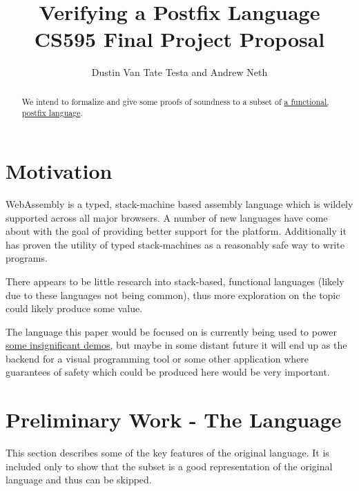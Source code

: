 \documentclass{article}
\title{Verifying a Postfix Language \\
    \large CS595 Final Project Proposal}
\author{Dustin Van Tate Testa and Andrew Neth}
\begin{document}
\maketitle
\begin{abstract}
We intend to formalize and give some proofs of soundness to a subset of \href{https://github.com/dvtate/postfix-haskell}{a functional, postfix language}.
\end{abstract}

\section{Motivation}
WebAssembly is a typed, stack-machine based assembly language which is wildely supported across all major browsers. A number of new languages have come about with the goal of providing better support for the platform. Additionally it has proven the utility of typed stack-machines as a reasonably safe way to write programs.

There appears to be little research into stack-based, functional languages (likely due to these languages not being common), thus more exploration on the topic could likely produce some value.

The language this paper would be focused on is currently being used to power \href{https://ridder.xyz/game}{some insignificant demos}, but maybe in some distant future it will end up as the backend for a visual programming tool or some other application where guarantees of safety which could be produced here would be very important.

\section{Preliminary Work - The Language}
This section describes some of the key features of the original language. It is included only to show that the subset is a good representation of the original language and thus can be skipped.
\end{document}
